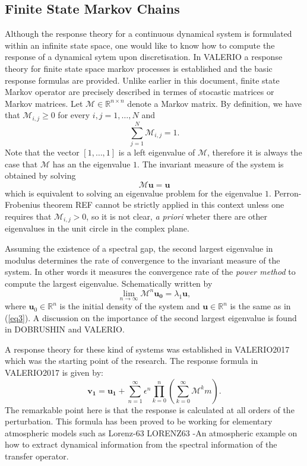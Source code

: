 \subsection*{Finite State Markov Chains}

Although the response theory for a continuous dynamical system is formulated within an infinite state space, one would like to know how to compute the response of a dynamical sytem upon discretisation. In VALERIO a response theory for finite state space markov processes is established and the basic response formulas are provided. Unlike earlier in this document, finite state Markov operator are precisely described in termes of stocastic matrices or Markov matrices. Let $\mathcal{M}\in \mathbb{R}^{n \times n}$ denote a Markov matrix. By definition, we have that $\mathcal{M}_{i,j}\geq 0$ for every $i,j=1,\ldots,N$ and
\begin{equation}
	\sum _{j=1}^{N}\mathcal{M}_{i,j}=1.
\end{equation}
Note that the vector $[1,\ldots , 1]$ is a left eigenvalue of $\mathcal{M}$, therefore it is always the case that $\mathcal{M}$ has an the eigenvalue $1$. The invariant measure of the system is obtained by solving
\begin{equation}\label{eq3}
	\mathcal{M}\mathbf{u}=\mathbf{u}
\end{equation}
which is equivalent to solving an eigenvalue problem for the eigenvalue $1$. Perron-Frobenius theorem REF cannot be strictly applied in this context unless one requires that $\mathcal{M}_{i,j}> 0$, so it is not clear, \emph{a priori} wheter there are other eigenvalues in the unit circle in the complex plane. 

Assuming the existence of a spectral gap, the second largest eigenvalue in modulus determines the rate of convergence to the invariant measure of the system. In other words it measures the convergence rate of the \emph{power method} to compute the largest eigenvalue. Schematically written by
\begin{equation}\label{powermethod}
\lim _{n\rightarrow \infty}\mathcal{M}^n\mathbf{u_0} = \lambda _1\mathbf{u},
\end{equation}
where $\mathbf{u}_0 \in \mathbb{R}^n$ is the initial density of the system and $\mathbf{u}\in \mathbb{R}^n$ is the same as in (\ref{eq3}). A discussion on the importance of the second largest eigenvalue is found in DOBRUSHIN and VALERIO.


A response theory for these kind of systems was established in VALERIO2017 which was the starting point of the research. The response formula in VALERIO2017 is given by:
\begin{equation}
\mathbf{v_1}=\mathbf{u_1} + \sum_{n=1}^{\infty}\epsilon ^{n} \prod _{k=0}^{n}\left( \sum_{k=0}^{\infty}\mathcal{M}^km \right).
\end{equation}
The remarkable point here is that the response is calculated at all orders of the perturbation. This formula has been proved to be working for elementary atmospheric models such as Lorenz-63 LORENZ63
-An atmospheric example on how to extract dynamical information from the spectral information of the transfer operator.

